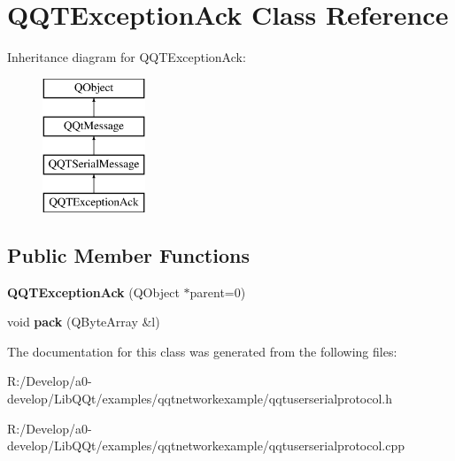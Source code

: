 \hypertarget{class_q_q_t_exception_ack}{}\section{Q\+Q\+T\+Exception\+Ack Class Reference}
\label{class_q_q_t_exception_ack}
Inheritance diagram for Q\+Q\+T\+Exception\+Ack\+:\begin{figure}[H]
\begin{center}
\leavevmode
\includegraphics[height=4.000000cm]{class_q_q_t_exception_ack}
\end{center}
\end{figure}
\subsection*{Public Member Functions}
\begin{DoxyCompactItemize}
\item 
\mbox{\label{class_q_q_t_exception_ack_a4fd1b1d03bfe3ef8eecd55309e626390}} 
{\bfseries Q\+Q\+T\+Exception\+Ack} (Q\+Object $\ast$parent=0)
\item 
\mbox{\label{class_q_q_t_exception_ack_aa22b1a0f7bdf85741a08018b58ce37b4}} 
void {\bfseries pack} (Q\+Byte\+Array \&l)
\end{DoxyCompactItemize}


The documentation for this class was generated from the following files\+:\begin{DoxyCompactItemize}
\item 
R\+:/\+Develop/a0-\/develop/\+Lib\+Q\+Qt/examples/qqtnetworkexample/qqtuserserialprotocol.\+h\item 
R\+:/\+Develop/a0-\/develop/\+Lib\+Q\+Qt/examples/qqtnetworkexample/qqtuserserialprotocol.\+cpp\end{DoxyCompactItemize}
